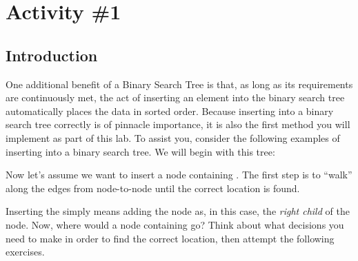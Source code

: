 	\section{Activity \#1}
		\subsection{Introduction}
			One additional benefit of a Binary Search Tree is that, as long as its requirements are continuously met, the act of inserting an element into the binary search tree automatically places the data in sorted order. Because inserting into a binary search tree correctly is of pinnacle importance, it is also the first method you will implement as part of this lab. To assist you, consider the following examples of inserting into a binary search tree. We will begin with this tree:

			\begin{center}
			\end{center}

			Now let's assume we want to insert a node containing . The first step is to ``walk'' along the edges from node-to-node until the correct location is found.

			\begin{center}
			\end{center}

			Inserting the  simply means adding the node as, in this case, the \emph{right child} of the  node. Now, where would a node containing  go? Think about what decisions you need to make in order to find the correct location, then attempt the following exercises.

